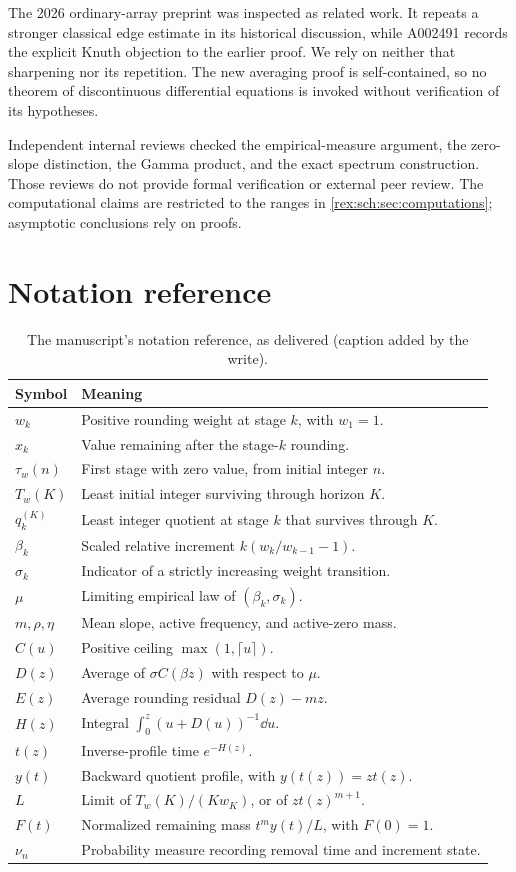 The 2026 ordinary-array preprint \cite{li} was inspected as
related work. It repeats a stronger classical edge estimate in
its historical discussion, while A002491 records the explicit
Knuth objection to the earlier proof. We rely on neither that
sharpening nor its repetition. The new averaging proof is
self-contained, so no theorem of discontinuous differential
equations is invoked without verification of its hypotheses.

Independent internal reviews checked the empirical-measure
argument, the zero-slope distinction, the Gamma product, and
the exact spectrum construction. Those reviews do not provide
formal verification or external peer review. The computational
claims are restricted to the ranges in
\cref{rex:sch:sec:computations}; asymptotic conclusions rely on proofs.

\section{Notation reference}\label{rex:sch:sec:notationref}

\begin{longtable}{@{}p{.19\linewidth}p{.75\linewidth}@{}}
 \caption{The manuscript's notation reference, as delivered (caption added by the write).}\label{rex:sch:tab:notationref}\\
 \toprule
 Symbol & Meaning\\
 \midrule
 \endhead
 $w_k$ & Positive rounding weight at stage $k$, with $w_1=1$.\\
 $x_k$ & Value remaining after the stage-$k$ rounding.\\
 $\tau_w(n)$ & First stage with zero value, from initial integer $n$.\\
 $T_w(K)$ & Least initial integer surviving through horizon $K$.\\
 $q_k^{(K)}$ & Least integer quotient at stage $k$ that survives through $K$.\\
 $\beta_k$ & Scaled relative increment $k(w_k/w_{k-1}-1)$.\\
 $\sigma_k$ & Indicator of a strictly increasing weight transition.\\
 $\mu$ & Limiting empirical law of $(\beta_k,\sigma_k)$.\\
 $m,\rho,\eta$ & Mean slope, active frequency, and active-zero mass.\\
 $C(u)$ & Positive ceiling $\max(1,\lceil u\rceil)$.\\
 $D(z)$ & Average of $\sigma C(\beta z)$ with respect to $\mu$.\\
 $E(z)$ & Average rounding residual $D(z)-mz$.\\
 $H(z)$ & Integral $\int_0^z(u+D(u))^{-1}\dd u$.\\
 $t(z)$ & Inverse-profile time $e^{-H(z)}$.\\
 $y(t)$ & Backward quotient profile, with $y(t(z))=zt(z)$.\\
 $L$ & Limit of $T_w(K)/(K w_K)$, or of $zt(z)^{m+1}$.\\
 $F(t)$ & Normalized remaining mass $t^my(t)/L$, with $F(0)=1$.\\
 $\nu_n$ & Probability measure recording removal time and increment state.\\
 \bottomrule
\end{longtable}
